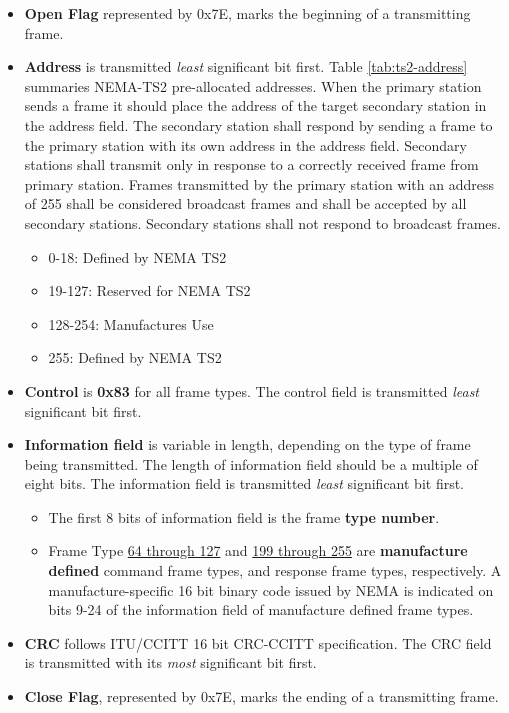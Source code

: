 \documentclass[]{article}
\begin{document}
\begin{itemize}
	\item \textbf{Open Flag} represented by 0x7E, marks the beginning of a transmitting frame.	
	\item \textbf{Address} is transmitted \textit{least} significant bit first. Table \ref{tab:ts2-address} summaries NEMA-TS2 pre-allocated addresses. When the primary station sends a frame it should place the address of the target secondary station in the address field. The secondary station shall respond by sending a frame to the primary station with its own address in the address field. Secondary stations shall transmit only in response to a correctly received frame from primary station.  Frames transmitted by the primary station with an address of 255 shall be considered broadcast frames and shall be accepted by all secondary stations. Secondary stations shall not respond to broadcast frames.
	\begin{itemize}
		\item 0-18: Defined by NEMA TS2
		\item 19-127: Reserved for NEMA TS2
		\item 128-254: Manufactures Use
		\item 255: Defined by NEMA TS2
	\end{itemize}
	\item \textbf{Control} is \textbf{0x83} for all frame types. The control field is transmitted \textit{least} significant bit first.
	\item \textbf{Information field} is variable in length, depending on the type of frame being transmitted. The length of information field should be a multiple of eight bits. The information field is transmitted \textit{least} significant bit first. 
	\begin{itemize}		
	\item The first 8 bits of information field is the frame \textbf{type number}. 
	\item Frame Type \underline{64 through 127} and \underline{199 through 255} are \textbf{manufacture defined} command frame types, and response frame types, respectively. A manufacture-specific 16 bit binary code issued by NEMA is indicated on bits 9-24 of the information field of manufacture defined frame types.
	\end{itemize}
	\item \textbf{CRC} follows ITU/CCITT 16 bit CRC-CCITT specification. The CRC field is transmitted with its \textit{most} significant bit first.
	\item \textbf{Close Flag}, represented by 0x7E, marks the ending of a transmitting frame.	
\end{itemize}
\end{document}
